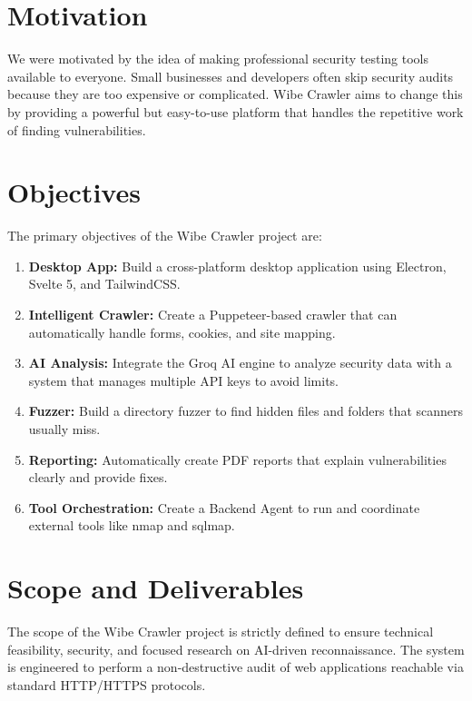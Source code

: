 \documentclass[12pt,oneside,a4paper]{book}
\begin{document}
\section{Motivation}

We were motivated by the idea of making professional security testing tools available to everyone. Small businesses and developers often skip security audits because they are too expensive or complicated. Wibe Crawler aims to change this by providing a powerful but easy-to-use platform that handles the repetitive work of finding vulnerabilities.

\section{Objectives}

The primary objectives of the Wibe Crawler project are:

\begin{enumerate}
  \item \textbf{Desktop App:} Build a cross-platform desktop application using Electron, Svelte 5, and TailwindCSS.
  \item \textbf{Intelligent Crawler:} Create a Puppeteer-based crawler that can automatically handle forms, cookies, and site mapping.
  \item \textbf{AI Analysis:} Integrate the Groq AI engine to analyze security data with a system that manages multiple API keys to avoid limits.
  \item \textbf{Fuzzer:} Build a directory fuzzer to find hidden files and folders that scanners usually miss.
  \item \textbf{Reporting:} Automatically create PDF reports that explain vulnerabilities clearly and provide fixes.
  \item \textbf{Tool Orchestration:} Create a Backend Agent to run and coordinate external tools like nmap and sqlmap.
\end{enumerate}

\section{Scope and Deliverables}

The scope of the Wibe Crawler project is strictly defined to ensure technical feasibility, security, and focused research on AI-driven reconnaissance. The system is engineered to perform a non-destructive audit of web applications reachable via standard HTTP/HTTPS protocols.
\end{document}
